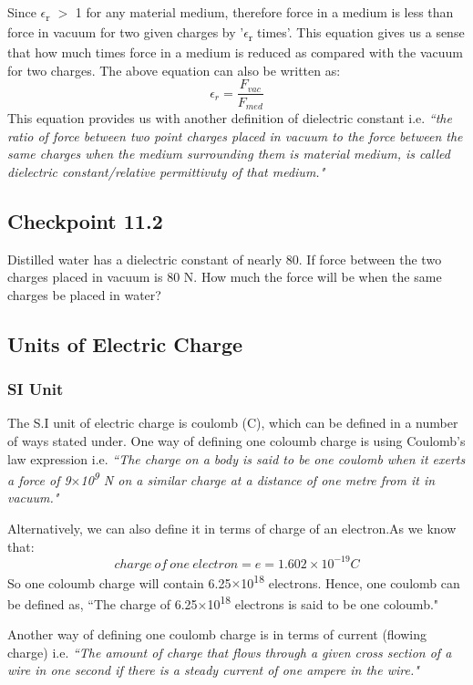 Since $\epsilon$\textsubscript{r} $>$ 1 for any material medium, therefore force in a medium
is less than force in vacuum for two given charges by '$\epsilon$\textsubscript{r} times'.
This equation gives us a sense that how much times force in a medium is reduced as compared with the vacuum for two charges.
The above equation can also be written as:
\begin{equation}\label{eq:11.12}
  \epsilon_{r} = \frac{F_{vac}}{F_{med}}
\end{equation}
This equation provides us with another definition of dielectric constant
i.e. \textit{``the ratio of force between two point charges placed in vacuum
to the force between the same charges when the medium surrounding
them is material medium,
is called dielectric constant/relative permittivuty of that medium."}
\subsection*{Checkpoint 11.2}
Distilled water has a dielectric constant of nearly 80.
If force between the two charges placed in vacuum is 80 N.
How much the force will be when the same charges be placed in water?
\subsection{Units of Electric Charge}
\subsubsection{SI Unit}
The S.I unit of electric charge is coulomb (C), which can be defined in a number of ways stated under.
One way of defining one coloumb charge is using Coulomb’s law
expression i.e. \textit{``The charge on a body is said to be one coulomb when it exerts
a force of 9$\times$10\textsuperscript{9} N on a similar charge at a distance
of one metre from it in vacuum."}

Alternatively, we can also define it in terms of charge of an electron.As we know that:
\begin{equation}
  charge\:of\:one\:electron = e = 1.602\times10^{-19} C \nonumber
\end{equation}
So one coloumb charge will contain 6.25$\times$10\textsuperscript{18} electrons.
Hence, one coulomb can be defined as, ``The charge of 6.25$\times$10\textsuperscript{18} electrons is said to be one coloumb."

Another way of defining one coulomb charge is in
terms of current (flowing charge) i.e. \textit{``The amount of charge that flows
through a given cross section of a wire in one second if there is a steady
current of one ampere in the wire."}
